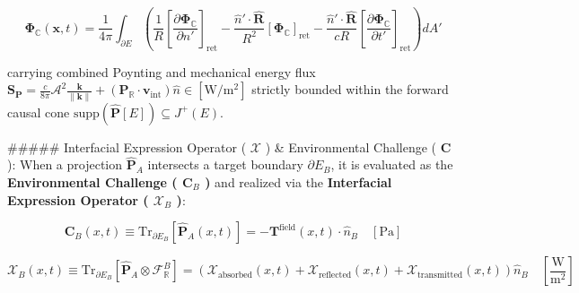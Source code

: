 \documentclass[11pt,a4paper]{article}
\theoremstyle{definition}
\theoremstyle{remark}
\begin{document}
\begin{equation}
\mathbf{\Phi}_{\mathbb{C}}(\mathbf{x}, t) = \frac{1}{4\pi}\int_{\partial E} \left( \frac{1}{R}[ \frac{\partial\mathbf{\Phi}_{\mathbb{C}}}{\partial n'} ]_{\text{ret}} - \frac{\hat{n}' \cdot \hat{\mathbf{R}}}{R^2}[\mathbf{\Phi}_{\mathbb{C}}]_{\text{ret}} - \frac{\hat{n}' \cdot \hat{\mathbf{R}}}{c R}[\frac{\partial\mathbf{\Phi}_{\mathbb{C}}}{\partial t'}]_{\text{ret}} \right) dA'
\end{equation}


carrying combined Poynting and mechanical energy flux $\mathbf{S}_{\mathbf{P}} = \frac{c}{8\pi} \mathcal{A}^2 \frac{\mathbf{k}}{\|\mathbf{k}\|} + (\mathbf{P}_{\mathbb{R}} \cdot \mathbf{v}_{\text{int}})\hat{n} \in [\mathrm{W/m^2}]$ strictly bounded within the forward causal cone $\mathrm{supp}(\hat{\mathbf{P}}[E]) \subseteq J^+(E)$.

\#\#\#\#\# Interfacial Expression Operator ( $\boldsymbol{\mathcal{X}}$ ) \& Environmental Challenge ( $\mathbf{C}$ ):
When a projection $\hat{\mathbf{P}}_A$ intersects a target boundary $\partial E_B$, it is evaluated as the \textbf{Environmental Challenge ( $\mathbf{C}_B$ )} and realized via the \textbf{Interfacial Expression Operator ( $\boldsymbol{\mathcal{X}}_B$ )}:


\begin{equation}
\boxed{\mathbf{C}_B(x, t) \equiv \mathrm{Tr}_{\partial E_B}[ \hat{\mathbf{P}}_A(x, t) ] = -\mathbf{T}^{\text{field}}(x, t) \cdot \hat{n}_B \quad [\mathrm{Pa}]}
\end{equation}



\begin{equation}
\boxed{\boldsymbol{\mathcal{X}}_B(x, t) \equiv \mathrm{Tr}_{\partial E_B}[ \hat{\mathbf{P}}_A \otimes \mathcal{F}_{\mathbb{R}}^B ] = \left( \mathcal{X}_{\text{absorbed}}(x, t) + \mathcal{X}_{\text{reflected}}(x, t) + \mathcal{X}_{\text{transmitted}}(x, t) \right) \hat{n}_B \quad [\frac{\mathrm{W}}{\mathrm{m^2}}]}
\end{equation}
\end{document}
